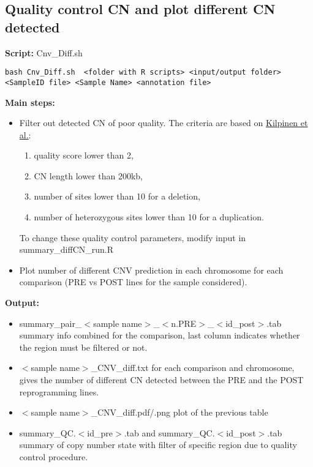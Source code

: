 \documentclass[11pt]{paper}
\begin{document}
\subsection{Quality control CN and plot different CN detected}
\textbf{Script:} Cnv\_Diff.sh
\begin{verbatim}
bash Cnv_Diff.sh  <folder with R scripts> <input/output folder> 
<SampleID file> <Sample Name> <annotation file>  
\end{verbatim}
\textbf{Main steps:}
\begin{itemize}
\item Filter out detected CN of poor quality. The criteria are based on \href{https://www.nature.com/articles/nature22403}{Kilpinen et al.}:
\begin{enumerate}
\item quality score lower than 2,
\item CN length lower than 200kb,
\item number of sites lower than 10 for a deletion,
\item number of heterozygous sites lower than 10 for a duplication.  
\end{enumerate}
To change these quality control parameters, modify input in summary\_diffCN\_run.R 
\item Plot number of different CNV prediction in each chromosome for each comparison (PRE vs POST lines for the sample considered).
\end{itemize}  
\noindent \textbf{Output:}
\begin{itemize}
\item summary\_pair\_$<$sample name$>$\_$<$n.PRE$>$\_$<$id\_post$>$.tab summary info combined for the comparison, last column indicates whether the region must be filtered or not.
\item $<$sample name$>$\_CNV\_diff.txt for each comparison and chromosome, gives the number of different CN detected between the PRE and the POST reprogramming lines.
\item $<$sample name$>$\_CNV\_diff.pdf/.png plot of the previous table
\item  summary\_QC.$<$id\_pre$>$.tab and summary\_QC.$<$id\_post$>$.tab summary of copy number state with filter of specific region due to quality control procedure.
\end{itemize}
\end{document}

